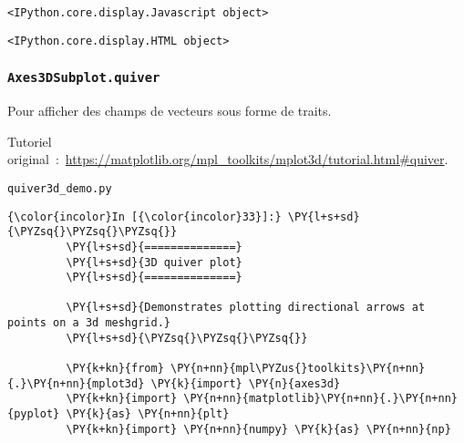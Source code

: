     
    \begin{verbatim}
<IPython.core.display.Javascript object>
    \end{verbatim}

    
    
    \begin{verbatim}
<IPython.core.display.HTML object>
    \end{verbatim}

    
    \hypertarget{axes3dsubplot.quiver}{%
\subsubsection{\texorpdfstring{\texttt{Axes3DSubplot.quiver}}{Axes3DSubplot.quiver}}\label{axes3dsubplot.quiver}}

    Pour afficher des champs de vecteurs sous forme de traits.

    Tutoriel
original~:~\url{https://matplotlib.org/mpl_toolkits/mplot3d/tutorial.html\#quiver}.

    \texttt{quiver3d\_demo.py}

    \begin{Verbatim}[commandchars=\\\{\}]
{\color{incolor}In [{\color{incolor}33}]:} \PY{l+s+sd}{\PYZsq{}\PYZsq{}\PYZsq{}}
         \PY{l+s+sd}{==============}
         \PY{l+s+sd}{3D quiver plot}
         \PY{l+s+sd}{==============}
         
         \PY{l+s+sd}{Demonstrates plotting directional arrows at points on a 3d meshgrid.}
         \PY{l+s+sd}{\PYZsq{}\PYZsq{}\PYZsq{}}
         
         \PY{k+kn}{from} \PY{n+nn}{mpl\PYZus{}toolkits}\PY{n+nn}{.}\PY{n+nn}{mplot3d} \PY{k}{import} \PY{n}{axes3d}
         \PY{k+kn}{import} \PY{n+nn}{matplotlib}\PY{n+nn}{.}\PY{n+nn}{pyplot} \PY{k}{as} \PY{n+nn}{plt}
         \PY{k+kn}{import} \PY{n+nn}{numpy} \PY{k}{as} \PY{n+nn}{np}
\end{Verbatim}


